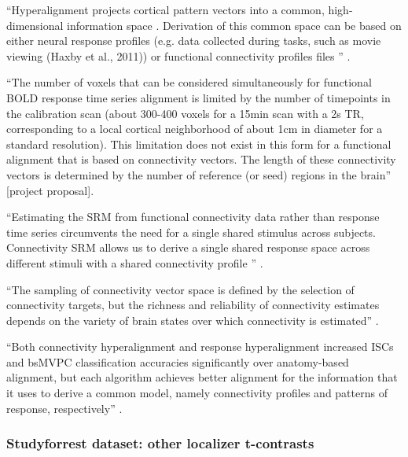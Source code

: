 ``Hyperalignment projects cortical pattern vectors into a common,
high-dimensional information space \citep{haxby2020hyperalignment}.
%
Derivation of this common space can be based on either neural response profiles
(e.g. data collected during tasks, such as movie viewing (Haxby et al., 2011))
or functional connectivity profiles files \citep{guntupalli2018computational}''
\citep{busch2021hybrid}.

``The number of voxels that can be considered simultaneously for functional BOLD
response time series alignment is limited by the number of timepoints in the
calibration scan (about 300-400 voxels for a 15min scan with a 2s TR,
corresponding to a local cortical neighborhood of about 1cm in diameter for a
standard resolution).
%
This limitation does not exist in this form for a functional alignment that is
based on connectivity vectors.
%
The length of these connectivity vectors is determined by the number of
reference (or seed) regions in the brain'' [project proposal].


``Estimating the SRM from functional connectivity data rather than response time
series circumvents the need for a single shared stimulus across subjects.
%
Connectivity SRM allows us to derive a single shared response space across
different stimuli with a shared connectivity profile
\citep{nastase2019leveraging}'' \citep{kumar2020brainiak}.

%
``The sampling of connectivity vector space is defined by the selection of
connectivity targets, but the richness and reliability of connectivity estimates
depends on the variety of brain states over which connectivity is estimated''
\citep{haxby2020hyperalignment}.

%
``Both connectivity hyperalignment and response hyperalignment increased ISCs
and bsMVPC classification accuracies significantly over anatomy-based alignment,
but each algorithm achieves better alignment for the information that it uses to
derive a common model, namely connectivity profiles and patterns of response,
respectively'' \citep{guntupalli2018computational}.





\subsubsection{Studyforrest dataset: other localizer t-contrasts}


